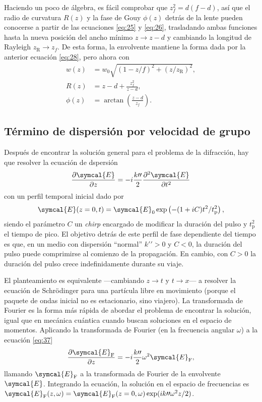 \documentclass{scrartcl} %
\newcommand*{\pdv}[2]{\frac{\partial#1}{\partial#2}}
\newcommand*{\pdvN}[3]{\frac{\partial^{#3}#1}{\partial{#2}^{#3}}}
\begin{document}
Haciendo un poco de álgebra, es fácil comprobar que $z^{2}_{f} = d(f-d)$, así que el radio de curvatura $R(z)$ y la fase de Gouy $\phi(z)$ detrás de la lente pueden conocerse a partir de las ecuaciones \eqref{eq:25} y \eqref{eq:26}, trasladando ambas funciones hasta la nueva posición del ancho mínimo $z \rightarrow z - d$ y cambiando la longitud de Rayleigh $z_{\mathrm{R}} \rightarrow z_{f}$. De esta forma, la envolvente mantiene la forma dada por la anterior ecuación \eqref{eq:28}, pero ahora con
\begin{align}
  w(z) & = w_{0}\sqrt{(1 - z/f)^{2} + (z/z_{\mathrm{R}})^{2}}, \label{eq:35} \\
  R(z) & = z - d + \frac{z^{2}_{f}}{z-d}, \label{eq:36} \\
  \phi(z) & = \arctan \left(\frac{z-d}{z_{f}}\right).
\end{align}

\subsection{Término de dispersión por velocidad de grupo}\label{sec:22}
Después de encontrar la solución general para el problema de la difracción, hay que resolver la ecuación de dspersión
\begin{equation}\label{eq:37}
  \pdv{\symcal{E}}{z} = -i \frac{k \prime \prime }{2} \pdvN{\symcal{E}}{t}{2}
\end{equation}
con un perfil temporal inicial dado por
\begin{equation}\label{eq:38}
  \symcal{E}(z=0,t) = \symcal{E}_{0} \exp\left(-(1+iC)t^{2}/t^{2}_{\mathrm{p}}\right),
\end{equation}
siendo el parámetro $C$ un \emph{chirp} encargado de modificar la duración del pulso y $t^{2}_{\mathrm{p}}$ el tiempo de pico. El objetivo detrás de este perfil de fase dependiente del tiempo es que, en un medio con dispersión \enquote{normal} $k \prime \prime > 0$ y $C < 0$, la duración del pulso puede comprimirse al comienzo de la propagación. En cambio, con $C > 0$ la duración del pulso crece indefinidamente durante su viaje.

El planteamiento es equivalente ---cambiando $z \rightarrow t$ y $t \rightarrow x$--- a resolver la ecuación de Schrödinger para una partícula libre en movimiento (porque el paquete de ondas inicial no es estacionario, sino viajero). La transformada de Fourier es la forma más rápida de abordar el problema de encontrar la solución, igual que en mecánica cuántica cuando buscan soluciones en el espacio de momentos. Aplicando la transformada de Fourier (en la frecuencia angular $\omega$) a la ecuación \eqref{eq:37}
\begin{equation}\label{eq:39}
  \pdv{\symcal{E}_{\mathrm{F}}}{z} = -i \frac{k \prime \prime}{2} \omega^{2} \symcal{E}_{\mathrm{F}},
\end{equation}
llamando $\symcal{E}_{\mathrm{F}}$ a la transformada de Fourier de la envolvente $\symcal{E}$. Integrando la ecuación, la solución en el espacio de frecuencias es $\symcal{E}_{\mathrm{F}}(z,\omega) = \symcal{E}_{\mathrm{F}}(z=0,\omega)\exp(ik \prime \prime \omega^{2}z/2)$.
\end{document}
